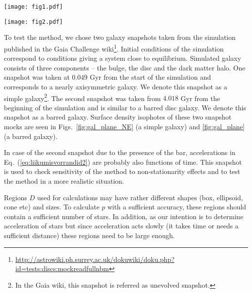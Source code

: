 \documentclass[fleqn,usenatbib]{mnras}
\begin{document}
\begin{figure*}	\texttt{[image: fig1.pdf]}
	\caption{Calculated (red arrows) and true (green arrows) acceleration vectors in the plane of the simple snapshot of the simulated galaxy. True accelerations are normalised to constant length and simulated ones according to them. We note that some of the red and green arrows are exactly on top of each other. Simulated regions together with their names are presented as black rectangular boxes (see also Table~\ref{tab:regions}). 
}\label{fig:gal_plane_NE}
\end{figure*}
\begin{figure*}
	\texttt{[image: fig2.pdf]}
	\caption{Modelled and true parameters together with error bars of accelerations (see Eq.~(\ref{eq:model_acc})) for twelve regions in the simple snapshot of the simulation. The errors are marginalised standard deviations of the posterior distribution samples. It is seen that acceleration components are rather well recovered (upper panels), but correction terms for accelerations for several regions have rather large uncertainties. } \label{fig:parval_NE}
\end{figure*}
To test the method, we chose two galaxy snapshots taken from the simulation \citep[see][]{Garbari:2011} published in the Gaia Challenge wiki\footnote{\url{http://astrowiki.ph.surrey.ac.uk/dokuwiki/doku.php?id=tests:discs:mockreadfullnbm}}. 
Initial conditions of the simulation correspond to conditions giving a system close to equilibrium. Simulated galaxy consists of three components -- the bulge, the disc and the dark matter halo. One snapshot was taken at $0.049$ Gyr from the start of the simulation and corresponds to a nearly axisymmetric galaxy. We denote this snapshot as a simple  galaxy\footnote{In the Gaia wiki, this snapshot is referred as unevolved snapshot.}. The second snapshot was taken from $4.018$ Gyr from the beginning of the simulation and is similar to a barred disc galaxy. We denote this snapshot as a barred galaxy. Surface density isophotes of these two snapshot mocks are seen in Figs.~\ref{fig:gal_plane_NE} (a simple galaxy) and \ref{fig:gal_plane} (a barred galaxy). 

In case of the second snapshot due to the presence of the bar,  accelerations in Eq.~(\ref{eq:liikumisvorrandid2}) are probably also functions of time. This snapshot is used to check sensitivity of the method to non-stationarity effects and to test the method in a more realistic situation.

Regions $D$ used for calculations may have rather different shapes (box, ellipsoid, cone etc) and sizes. To calculate $p$ with a sufficient accuracy, these regions should contain a sufficient number of stars. In addition, as our intention is to determine acceleration of stars but since acceleration acts slowly (it takes time or needs a sufficient distance) these regions need to be large enough. 
\end{document}
